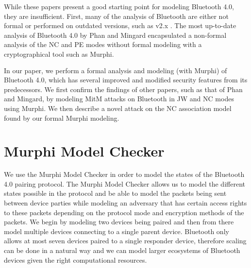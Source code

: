 \documentclass{acm_proc_article-sp}
\begin{document}
While these papers present a good starting point for modeling Bluetooth 4.0, they are insufficient. First, many of the analysis of Bluetooth are either not formal or performed on outdated versions, such as v2.x \cite{manish:1,dunning:1,lindell:1,lindell:2}. The most up-to-date analysis of Bluetooth 4.0 by Phan and Mingard \cite{phan:mingard} encapsulated a non-formal analysis of the NC and PE modes without formal modeling with a cryptographical tool such as Murphi.

In our paper, we perform a formal analysis and modeling (with Murphi) of Bluetooth 4.0, which has several improved and modified security features from its predecessors. We first confirm the findings of other papers, such as that of Phan and Mingard, by modeling MitM attacks on Bluetooth in JW and NC modes using Murphi. We then describe a novel attack on the NC association model found by our formal Murphi modeling.

\section{Murphi Model Checker}
We use the Murphi Model Checker \cite{bau:mitchell} in order to model the states of the Bluetooth 4.0 pairing protocol. The Murphi Model Checker allows us to model the different states possible in the protocol and be able to model the packets being sent between device parties while modeling an adversary that has certain access rights to these packets depending on the protocol mode and encryption methods of the packets. We begin by modeling two devices being paired and then from there model multiple devices connecting to a single parent device. Bluetooth only allows at most seven devices paired to a single responder device, therefore scaling can be done in a natural way and we can model larger ecosystems of Bluetooth devices given the right computational resources.
\end{document}
